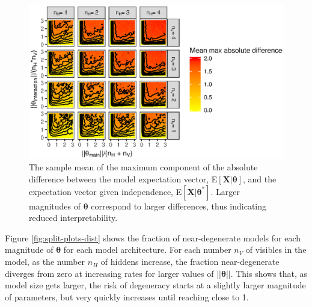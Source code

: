 \documentclass[]{article}
\theoremstyle{definition}
\newcommand{\nv}{{n_{\scriptscriptstyle V}}}
\newcommand{\nh}{{n_{\scriptscriptstyle H}}}
\begin{document}
\begin{figure}
\includegraphics{paper_files/figure-latex/uninterp-plots-1} \caption{The sample mean of the maximum component of the absolute difference between the model expectation vector, E$\left[\boldsymbol X | \boldsymbol \theta\right]$, and the expectation vector given independence, E$\left[\boldsymbol X | \boldsymbol \theta^* \right ]$. Larger magnitudes of $\boldsymbol \theta$ correspond to larger differences, thus indicating reduced interpretability.}\label{fig:uninterp-plots}
\end{figure}
Figure \ref{fig:split-plots-dist} shows the fraction of near-degenerate
models for each magnitude of \(\boldsymbol \theta\) for each model
architecture. For each number \(\nv\) of visibles in the model, as the
number \(\nh\) of hiddens increase, the fraction near-degenerate
diverges from zero at increasing rates for larger values of
\(||\boldsymbol \theta||\). This shows that, as model size gets larger,
the risk of degeneracy starts at a slightly larger magnitude of
parameters, but very quickly increases until reaching close to 1.
\end{document}
